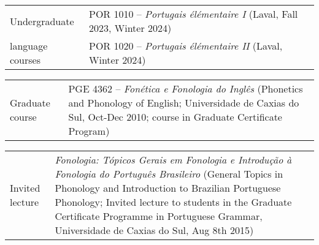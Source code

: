 \documentclass[letterpaper,10pt]{article}
\begin{document}
\begin{tabular}{p{2.7cm}p{14.2cm}}

Undergraduate	&	POR 1010 -- \emph{Portugais \'el\'ementaire I} (Laval, Fall 2023, Winter 2024) \\
language courses & POR 1020 -- \emph{Portugais \'el\'ementaire II} (Laval, Winter 2024)\\
						

\end{tabular}



\begin{tabular}{p{2.7cm}p{14.2cm}}

Graduate course	&	PGE 4362 -- \emph{Fon\'etica e Fonologia do Ingl\^es} (Phonetics and Phonology of English; Universidade de Caxias do Sul, Oct-Dec 2010; course in Graduate Certificate Program) \\
						

\end{tabular}



\begin{tabular}{p{2.7cm}p{14.2cm}}

Invited lecture	&	\emph{Fonologia: T\'opicos Gerais em Fonologia e Introdu\c{c}\~ao \`{a} Fonologia do Portugu\^es Brasileiro} (General Topics in Phonology and Introduction to Brazilian Portuguese Phonology; Invited lecture to students in the Graduate Certificate Programme in Portuguese Grammar, Universidade de Caxias do Sul, Aug 8th 2015)
						

\end{tabular}

 
 


 
 


\vspace{0.3cm}
\end{document}
